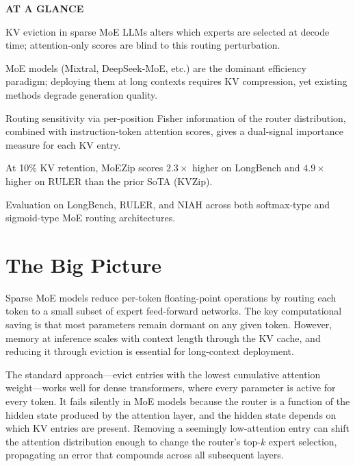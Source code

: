 \documentclass[10pt,twocolumn]{article}
\begin{document}
\begin{mdframed}[backgroundcolor=boxgray,linecolor=rulered,linewidth=1pt,
    innerleftmargin=6pt,innerrightmargin=6pt,
    innertopmargin=6pt,innerbottommargin=6pt]
\textbf{\small AT A GLANCE}\par\vspace{4pt}
\begin{description}[leftmargin=0pt,labelsep=4pt,itemsep=2pt,parsep=0pt,
    font=\small\bfseries]
  \item[Problem:] KV eviction in sparse MoE LLMs alters which experts
    are selected at decode time; attention-only scores are blind to this
    routing perturbation.
  \item[Why it matters:] MoE models (Mixtral, DeepSeek-MoE, etc.) are
    the dominant efficiency paradigm; deploying them at long contexts
    requires KV compression, yet existing methods degrade generation quality.
  \item[Method:] Routing sensitivity via per-position Fisher information of the
    router distribution, combined with instruction-token attention scores, gives
    a dual-signal importance measure for each KV entry.
  \item[Result:] At 10\% KV retention, MoEZip scores $2.3\times$ higher
    on LongBench and $4.9\times$ higher on RULER than the prior SoTA (KVZip).
  \item[Evidence:] Evaluation on LongBench, RULER, and NIAH across both
    softmax-type and sigmoid-type MoE routing architectures.
\end{description}
\end{mdframed}

\section{The Big Picture}

Sparse MoE models reduce per-token floating-point operations by routing
each token to a small subset of expert feed-forward networks. The key
computational saving is that most parameters remain dormant on any given
token. However, memory at inference scales with context length through the
KV cache, and reducing it through eviction is essential for long-context
deployment.

The standard approach---evict entries with the lowest cumulative attention
weight---works well for dense transformers, where every parameter is active
for every token. It fails silently in MoE models because the router is a
function of the hidden state produced by the attention layer, and the
hidden state depends on which KV entries are present. Removing a
seemingly low-attention entry can shift the attention distribution enough
to change the router's top-$k$ expert selection, propagating an error that
compounds across all subsequent layers.
\end{document}
